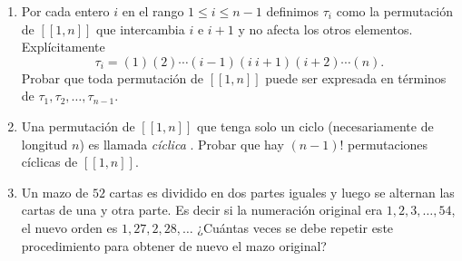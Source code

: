 \begin{enumerate}
\item Por cada entero $i$ en el rango $1 \le i \le n-1$ definimos $\tau_i$ como la permutación de $[[1,n]]$ que intercambia $i$ e $i+1$ y no afecta los otros elementos. Explícitamente 
$$
\tau_i = (1)(2)\cdots(i-1)(i\ i+1)(i+2)\cdots(n).
$$
Probar que toda permutación de $[[1,n]]$ puede ser expresada en términos de $\tau_1,\tau_2,\ldots,\tau_{n-1}$. 

\item Una permutación de $[[1,n]]$ que tenga solo un ciclo (necesariamente de longitud $n$) es llamada \textit{cíclica}  . Probar que hay $(n-1)!$ permutaciones cíclicas de $[[1,n]]$.

\item Un mazo de $52$ cartas es dividido en dos partes iguales y luego se alternan las cartas de una y otra parte. Es decir si la numeración original era $1,2,3,\ldots,54$, el nuevo orden es $1,27,2,28,\ldots$ ¿Cuántas veces se debe repetir este procedimiento para obtener de nuevo el mazo original? 
\end{enumerate}
